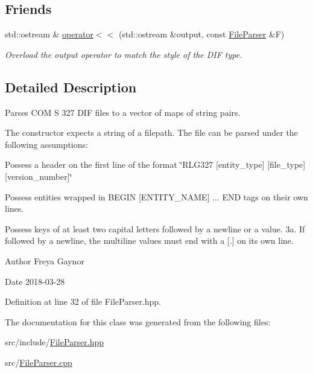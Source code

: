\subsection*{Friends}
\begin{DoxyCompactItemize}
\item 
std\+::ostream \& \hyperlink{group__vespertiine_ga6d174b85be314a05d54a9d63a7f1fbbb}{operator$<$$<$} (std\+::ostream \&output, const \hyperlink{classvespertiine_1_1FileParser}{File\+Parser} \&F)
\begin{DoxyCompactList}\small\item\em Overload the output operator to match the style of the D\+IF type. \end{DoxyCompactList}\end{DoxyCompactItemize}


\subsection{Detailed Description}
Parses C\+OM S 327 D\+IF files to a vector of maps of string pairs. 

The constructor expects a string of a filepath. The file can be parsed under the following assumptions\+:
\begin{DoxyEnumerate}
\item Possess a header on the first line of the format \char`\"{}\+R\+L\+G327 \mbox{[}entity\+\_\+type\mbox{]} \mbox{[}file\+\_\+type\mbox{]} \mbox{[}version\+\_\+number\mbox{]}\char`\"{}
\item Possess entities wrapped in B\+E\+G\+IN \mbox{[}E\+N\+T\+I\+T\+Y\+\_\+\+N\+A\+ME\mbox{]} ... E\+ND tags on their own lines.
\item Possess keys of at least two capital letters followed by a newline or a value. 3a. If followed by a newline, the multiline values must end with a \mbox{[}.\mbox{]} on its own line.
\end{DoxyEnumerate}

\begin{DoxyAuthor}{Author}
Freya Gaynor 
\end{DoxyAuthor}
\begin{DoxyDate}{Date}
2018-\/03-\/28 
\end{DoxyDate}


Definition at line 32 of file File\+Parser.\+hpp.



The documentation for this class was generated from the following files\+:\begin{DoxyCompactItemize}
\item 
src/include/\hyperlink{FileParser_8hpp}{File\+Parser.\+hpp}\item 
src/\hyperlink{FileParser_8cpp}{File\+Parser.\+cpp}\end{DoxyCompactItemize}
